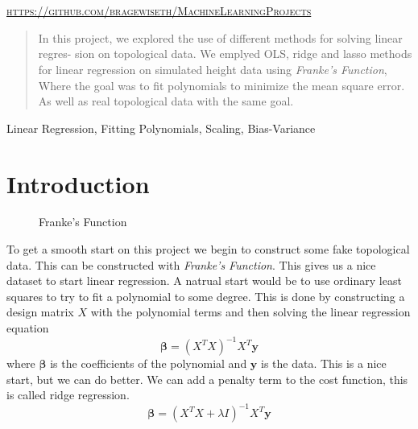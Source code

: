 \documentclass[twoside,11pt]{report}
\begin{document}
\begin{titlepage}
\begin{minipage}{0.4\textwidth}
	\end{minipage}\\[2 cm]
	\@date\\
    \vspace*{25mm}
    \textsc{\url{https://github.com/bragewiseth/MachineLearningProjects}}
	
	
    
    
    
    
	
\end{titlepage}
\nocite{*}
\newpage
\tableofcontents
\newpage

\begin{abstract}%
\lettrine{I}{}n this project, we explored the use of different methods for solving linear regres-
sion on topological data. We emplyed OLS, ridge and lasso methods for linear regression on
simulated height data using \emph{Franke's Function}, Where the goal was to fit polynomials to minimize the
mean square error. As well as real topological data with the same goal.
\end{abstract}
\begin{keywords}
    Linear Regression, Fitting Polynomials, Scaling, Bias-Variance 
\end{keywords}

\section{Introduction}

\begin{figure}
    \caption{\small Franke's Function}
    \label{frankfunc}
    \begin{center}
    \begin{adjustbox}{clip,trim=4cm 3.4cm 3cm 4.8cm, max width=0.3\textwidth}
    
    \end{adjustbox}
    \end{center}
\end{figure}
To get a smooth start on this project we begin to construct some fake topological data. This can be constructed with
\emph{Franke's Function}. This gives us a nice dataset to start linear regression. 
A natrual start would be to use ordinary least squares to try to fit a polynomial to some degree. This is done by
constructing a design matrix $X$ with the polynomial terms and then solving the linear regression equation
\begin{equation}
    \boldsymbol{\beta} = (X^T X)^{-1} X^T \boldsymbol{y}
\end{equation}
where $\boldsymbol{\beta}$ is the coefficients of the polynomial and $\boldsymbol{y}$ is the data.
This is a nice start, but we can do better. We can add a penalty term to the cost function, this is called ridge regression.
\begin{equation}
    \boldsymbol{\beta} = (X^T X + \lambda I)^{-1} X^T \boldsymbol{y}
\end{equation}
\end{document}
